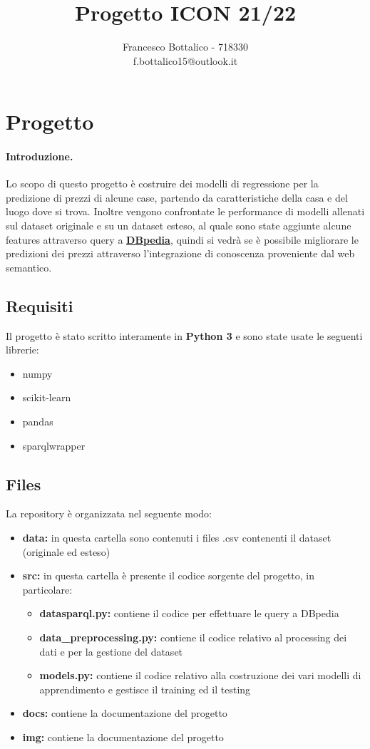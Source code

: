\documentclass{article}
\title{Progetto ICON 21/22}
\author{Francesco Bottalico - 718330 \\ f.bottalico15@outlook.it}
\date{}
\begin{document}
\maketitle
\tableofcontents

\section{Progetto}
\paragraph{Introduzione.}
Lo scopo di questo progetto è costruire dei modelli di regressione per la
predizione di prezzi di alcune case, partendo da caratteristiche della casa e
del luogo dove si trova. Inoltre vengono confrontate le performance di modelli
allenati sul dataset originale e su un dataset esteso, al quale sono state
aggiunte alcune features attraverso query a \href{http://dbpedia.org}
{\textbf{DBpedia}}, quindi si vedrà se è possibile migliorare le predizioni 
dei prezzi attraverso l'integrazione di conoscenza proveniente dal web
semantico.

\subsection{Requisiti}
Il progetto è stato scritto interamente in \textbf{Python 3} e sono state usate
le seguenti librerie:
\begin{itemize}
	\itemsep0em
	\item numpy
	\item scikit-learn
	\item pandas
	\item sparqlwrapper
\end{itemize}

\subsection{Files}
La repository è organizzata nel seguente modo:
\begin{itemize}
	\itemsep0em
	\item \textbf{data:} in questa cartella sono contenuti i files .csv 
		contenenti il dataset (originale ed esteso)
	\item \textbf{src:} in questa cartella è presente il codice sorgente del
		progetto, in particolare:
		\begin{itemize}
		\itemsep0em
			\item \textbf{datasparql.py:} contiene il codice per effettuare le
				query a DBpedia
			\item \textbf{data\_preprocessing.py:} contiene il codice relativo
				al processing dei dati e per la gestione del dataset
			\item \textbf{models.py:} contiene il codice relativo alla
				costruzione dei vari modelli di apprendimento e gestisce il
				training ed il testing
		\end{itemize}
	\item \textbf{docs:} contiene la documentazione del progetto
	\item \textbf{img:} contiene la documentazione del progetto
\end{itemize}
\end{document}
